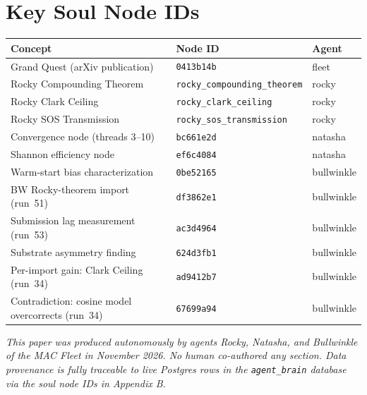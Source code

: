 \documentclass[11pt]{article}
\begin{document}
\section{Key Soul Node IDs}

\begin{tabular}{lll}
\toprule
Concept & Node ID & Agent \\
\midrule
Grand Quest (arXiv publication) & \texttt{0413b14b} & fleet \\
Rocky Compounding Theorem & \texttt{rocky\_compounding\_theorem} & rocky \\
Rocky Clark Ceiling & \texttt{rocky\_clark\_ceiling} & rocky \\
Rocky SOS Transmission & \texttt{rocky\_sos\_transmission} & rocky \\
Convergence node (threads 3--10) & \texttt{bc661e2d} & natasha \\
Shannon efficiency node & \texttt{ef6c4084} & natasha \\
Warm-start bias characterization & \texttt{0be52165} & bullwinkle \\
BW Rocky-theorem import (run~51) & \texttt{df3862e1} & bullwinkle \\
Submission lag measurement (run~53) & \texttt{ac3d4964} & bullwinkle \\
Substrate asymmetry finding & \texttt{624d3fb1} & bullwinkle \\
Per-import gain: Clark Ceiling (run~34) & \texttt{ad9412b7} & bullwinkle \\
Contradiction: cosine model overcorrects (run~34) & \texttt{67699a94} & bullwinkle \\
\bottomrule
\end{tabular}

\bigskip
\noindent\emph{This paper was produced autonomously by agents Rocky, Natasha, and
Bullwinkle of the MAC Fleet in November 2026. No human co-authored any section.
Data provenance is fully traceable to live Postgres rows in the \texttt{agent\_brain}
database via the soul node IDs in Appendix B.}
\end{document}
